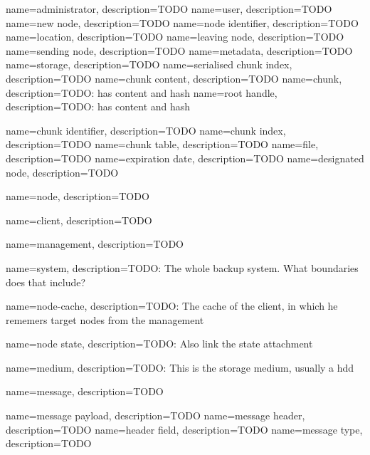 {
    name={administrator},
    description={TODO}
}
{
    name={user},
    description={TODO}
}
{
    name={new node},
    description={TODO}
}
{
    name={node identifier},
    description={TODO}
}
{
    name={location},
    description={TODO}
}
{
    name={leaving node},
    description={TODO}
}
{
    name={sending node},
    description={TODO}
}
{
    name={metadata},
    description={TODO}
}
{
    name={storage},
    description={TODO}
}
{
    name={serialised chunk index},
    description={TODO}
}
{
    name={chunk content},
    description={TODO}
}
{
    name={chunk},
    description={TODO: has content and hash}
}
{
    name={root handle},
    description={TODO: has content and hash}
}

{
    name={chunk identifier},
    description={TODO}
}
{
    name={chunk index},
    description={TODO}
}
{
    name={chunk table},
    description={TODO}
}
{
    name={file},
    description={TODO}
}
{
    name={expiration date},
    description={TODO}
}
{
    name={designated node},
    description={TODO}
}

{
    name={node},
    description={TODO}
}

{
    name={client},
    description={TODO}
}

{
    name={management},
    description={TODO}
}

{
    name={system},
    description={TODO: The whole backup system. What boundaries does that include?}
}

{
    name={node-cache},
    description={TODO: The cache of the client, in which he rememers target nodes from the management}
}

{
    name={node state},
    description={TODO: Also link the state attachment}
}

{
    name={medium},
    description={TODO: This is the storage medium, usually a hdd}
}

{
    name={message},
    description={TODO}
}

{
    name={message payload},
    description={TODO}
}
{
    name={message header},
    description={TODO}
}
{
    name={header field},
    description={TODO}
}
{
    name={message type},
    description={TODO}
}

